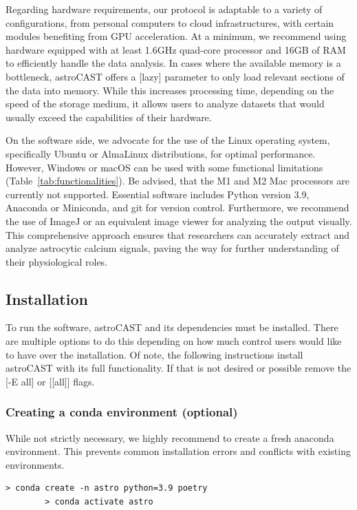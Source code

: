 \documentclass[utf8]{FrontiersinHarvard}
\newcommand{\inlineBash}[1]{%
    \begingroup
    \edef\temp{#1}%
    \expandafter\StrSubstitute\expandafter{\temp}{--}{-{-}}[\temp]%
    \tcbox[on line, boxsep=0pt, left=1pt, right=1pt, top=1pt, bottom=1pt,
        boxrule=0pt, arc=0pt, outer arc=0pt, colback=lightgray]{
        \texttt{\small \temp}
    }%
    \endgroup
}
\newcommand{\inlinepy}[1]{\inlineBash{#1}}
\newcommand{\tref}[1]{ (Table~\ref{tab:#1})}
\begin{document}
    Regarding hardware requirements, our protocol is adaptable to a variety of configurations, from personal computers to cloud infrastructures, with certain modules benefiting from \ac{GPU} acceleration. At a minimum, we recommend using hardware equipped with at least 1.6GHz quad-core processor and 16GB of RAM to efficiently handle the data analysis. In cases where the available memory is a bottleneck, astroCAST offers a \inlinepy{lazy} parameter to only load relevant sections of the data into memory. While this increases processing time, depending on the speed of the storage medium, it allows users to analyze datasets that would usually exceed the capabilities of their hardware.

    On the software side, we advocate for the use of the Linux operating system, specifically Ubuntu or AlmaLinux distributions, for optimal performance. However, Windows or macOS can be used with some functional limitations\tref{functionalities}. Be advised, that the M1 and M2 Mac processors are currently not supported. Essential software includes Python version 3.9, Anaconda or Miniconda, and git for version control. Furthermore, we recommend the use of ImageJ or an equivalent image viewer for analyzing the output visually. This comprehensive approach ensures that researchers can accurately extract and analyze astrocytic calcium signals, paving the way for further understanding of their physiological roles.

    \subsection{Installation}
    To run the software, astroCAST and its dependencies must be installed. There are multiple options to do this depending on how much control users would like to have over the installation. Of note, the following instructions install astroCAST with its full functionality. If that is not desired or possible remove the \inlineBash{-E all} or \inlineBash{[all]} flags.

    \subsubsection{Creating a conda environment (optional)}
    While not strictly necessary, we highly recommend to create a fresh anaconda environment. This
    prevents common installation errors and conflicts with existing environments.

    \begin{lstlisting}[style=bashStyle]
        > conda create -n astro python=3.9 poetry
        > conda activate astro
    \end{lstlisting}
\end{document}
